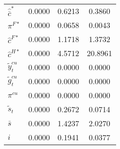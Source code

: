 \begin{center}
\begin{longtable}{lccc}
${\hat {\bar c}^*}  $	 & 	       0.0000	 & 	       0.6213	 & 	       0.3860 \\ 
${\pi^{F*}}         $	 & 	       0.0000	 & 	       0.0658	 & 	       0.0043 \\ 
${\hat c^{F*}}      $	 & 	       0.0000	 & 	       1.1718	 & 	       1.3732 \\ 
${\hat c^{H*}}      $	 & 	       0.0000	 & 	       4.5712	 & 	      20.8961 \\ 
${\tilde y_t^{cu}}  $	 & 	       0.0000	 & 	       0.0000	 & 	       0.0000 \\ 
${\tilde g_t^{cu}}  $	 & 	       0.0000	 & 	       0.0000	 & 	       0.0000 \\ 
${\pi^{cu}}         $	 & 	       0.0000	 & 	       0.0000	 & 	       0.0000 \\ 
${\tilde s_t}       $	 & 	       0.0000	 & 	       0.2672	 & 	       0.0714 \\ 
${\bar s}           $	 & 	       0.0000	 & 	       1.4237	 & 	       2.0270 \\ 
${i}                $	 & 	       0.0000	 & 	       0.1941	 & 	       0.0377 \\ 
\end{longtable}
 \end{center}
